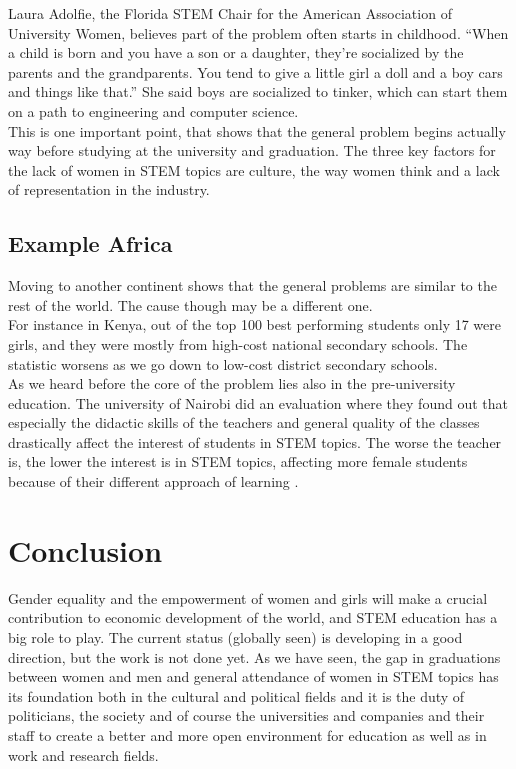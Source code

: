 	Laura Adolfie, the Florida STEM Chair for the American Association of University Women, believes part of the problem often starts in childhood. “When a child is born and you have a son or a daughter, they’re socialized by the parents and the grandparents. You tend to give a little girl a doll and a boy cars and things like that.” \cite{tusa1} She said boys are socialized to tinker, which can start them on a path to engineering and computer science.\\
	\newline
	This is one important point, that shows that the general problem begins actually way before studying at the university and graduation. The three key factors for the lack of women in STEM topics are culture, the way women think and a lack of representation in the industry.
	
	\subsection{Example Africa}
	Moving to another continent shows that the general problems are similar to the rest of the world. The cause though may be a different one.\\
	
	For instance in Kenya, out of the top 100 best performing students only 17 were girls, and they were mostly from high-cost national secondary schools. \cite{tafrica1} The statistic worsens as we go down to low-cost district secondary schools.\\
	
	As we heard before the core of the problem lies also in the pre-university education.
	The university of Nairobi did an evaluation where they found out that especially the didactic skills of the teachers and general quality of the classes drastically affect the interest of students in STEM topics. The worse the teacher is, the lower the interest is in STEM topics, affecting more female students because of their different approach of learning \cite{tafrica1} \cite{tchina1}.
	
	\section{Conclusion}
	Gender equality and the empowerment of women and girls will make a crucial contribution to economic development of the world, and STEM education has a big role to play. The current status (globally seen) is  developing in a good direction, but the work is not done yet. As we have seen, the gap in graduations between women and men and general attendance of women in STEM topics has its foundation both in the cultural and political fields and it is the duty of politicians, the society and of course the universities and companies and their staff to create a better and more open environment for education as well as in work and research fields.